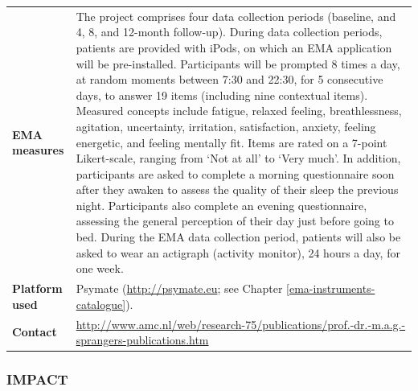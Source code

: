 \documentclass[]{book}
\begin{document}
\begin{longtable}[]{@{}ll@{}}
\begin{minipage}[t]{0.25\columnwidth}\raggedright\strut
\textbf{EMA measures}\strut
\end{minipage} & \begin{minipage}[t]{0.69\columnwidth}\raggedright\strut
The project comprises four data collection periods (baseline, and 4, 8,
and 12-month follow-up). During data collection periods, patients are
provided with iPods, on which an EMA application will be pre-installed.
Participants will be prompted 8 times a day, at random moments between
7:30 and 22:30, for 5 consecutive days, to answer 19 items (including
nine contextual items). Measured concepts include fatigue, relaxed
feeling, breathlessness, agitation, uncertainty, irritation,
satisfaction, anxiety, feeling energetic, and feeling mentally fit.
Items are rated on a 7-point Likert-scale, ranging from `Not at all' to
`Very much'. In addition, participants are asked to complete a morning
questionnaire soon after they awaken to assess the quality of their
sleep the previous night. Participants also complete an evening
questionnaire, assessing the general perception of their day just before
going to bed. During the EMA data collection period, patients will also
be asked to wear an actigraph (activity monitor), 24 hours a day, for
one week.\strut
\end{minipage}\tabularnewline
\begin{minipage}[t]{0.25\columnwidth}\raggedright\strut
\textbf{Platform used}\strut
\end{minipage} & \begin{minipage}[t]{0.69\columnwidth}\raggedright\strut
Psymate (\url{http://psymate.eu}; see Chapter
\ref{ema-instruments-catalogue}).\strut
\end{minipage}\tabularnewline
\begin{minipage}[t]{0.25\columnwidth}\raggedright\strut
\textbf{Contact}\strut
\end{minipage} & \begin{minipage}[t]{0.69\columnwidth}\raggedright\strut
\url{http://www.amc.nl/web/research-75/publications/prof.-dr.-m.a.g.-sprangers-publications.htm}\strut
\end{minipage}\tabularnewline
\bottomrule
\end{longtable}

\subsubsection{IMPACT}\label{impact}
\end{document}
